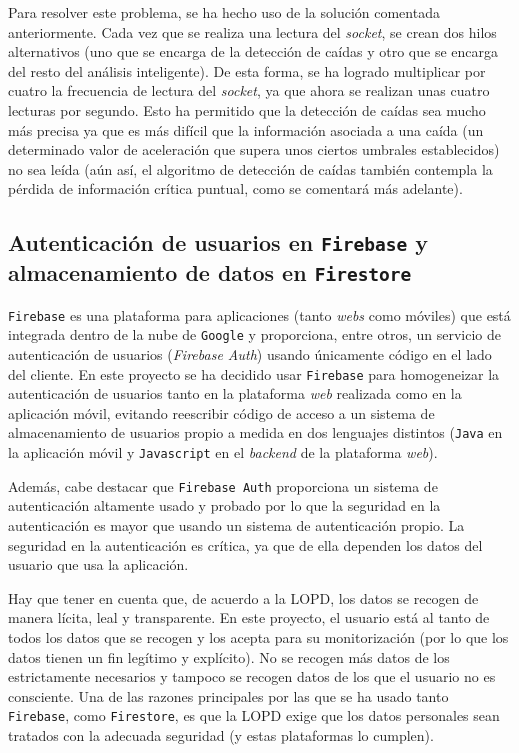 Para resolver este problema, se ha hecho uso de la solución comentada anteriormente. Cada vez que se realiza una lectura del \textit{socket}, se crean dos hilos alternativos (uno que se encarga de la detección de caídas y otro que se encarga del resto del análisis inteligente). De esta forma, se ha logrado multiplicar por cuatro la frecuencia de lectura del \textit{socket}, ya que ahora se realizan unas cuatro lecturas por segundo. Esto ha permitido que la detección de caídas sea mucho más precisa ya que es más difícil que la información asociada a una caída (un determinado valor de aceleración que supera unos ciertos umbrales establecidos) no sea leída (aún así, el algoritmo de detección de caídas también contempla la pérdida de información crítica puntual, como se comentará más adelante).

\subsection{Autenticación de usuarios en \texttt{Firebase} y almacenamiento de datos en \texttt{Firestore}} 

\texttt{Firebase} es una plataforma para aplicaciones (tanto \textit{webs} como móviles) que está integrada dentro de la nube de \texttt{Google} y proporciona, entre otros, un servicio de autenticación de usuarios (\textit{Firebase Auth}) usando únicamente código en el lado del cliente. En este proyecto se ha decidido usar \texttt{Firebase} para homogeneizar la autenticación de usuarios tanto en la plataforma \textit{web} realizada como en la aplicación móvil, evitando reescribir código de acceso a un sistema de almacenamiento de usuarios propio a medida en dos lenguajes distintos (\texttt{Java} en la aplicación móvil y \texttt{Javascript} en el \textit{backend} de la plataforma \textit{web}).

Además, cabe destacar que \texttt{Firebase Auth} proporciona un sistema de autenticación altamente usado y probado por lo que la seguridad en la autenticación es mayor que usando un sistema de autenticación propio. La seguridad en la autenticación es crítica, ya que de ella dependen los datos del usuario que usa la aplicación.

Hay que tener en cuenta que, de acuerdo a la \ac{LOPD}, los datos se recogen de manera lícita, leal y transparente. En este proyecto, el usuario está al tanto de todos los datos que se recogen y los acepta para su monitorización (por lo que los datos tienen un fin legítimo y explícito). No se recogen más datos de los estrictamente necesarios y tampoco se recogen datos de los que el usuario no es consciente. Una de las razones principales por las que se ha usado tanto \texttt{Firebase}, como \texttt{Firestore}, es que la \ac{LOPD} exige que los datos personales sean tratados con la adecuada seguridad (y estas plataformas lo cumplen).

